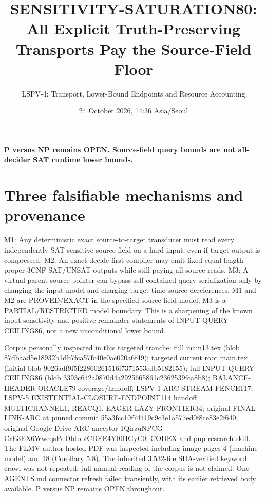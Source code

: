 \documentclass[11pt]{article}
\title{SENSITIVITY-SATURATION80: All Explicit Truth-Preserving Transports Pay the Source-Field Floor}
\author{LSPV-4: Transport, Lower-Bound Endpoints and Resource Accounting}
\date{24 October 2026, 14:36 Asia/Seoul}
\begin{document}
\maketitle
\begin{center}\textbf{P versus NP remains OPEN. Source-field query bounds are not all-decider SAT runtime lower bounds.}\end{center}

\section{Three falsifiable mechanisms and provenance}
M1: Any deterministic exact source-to-target transducer must read every independently SAT-sensitive source field on a hard input, even if target output is compressed. M2: An exact decide-first compiler may emit fixed equal-length proper-3CNF SAT/UNSAT outputs while still paying all source reads. M3: A virtual parent-source pointer can bypass self-contained-query serialization only by changing the input model and charging target-time source dereferences. M1 and M2 are PROVED/EXACT in the specified source-field model; M3 is a PARTIAL/RESTRICTED model boundary. This is a sharpening of the known input sensitivity and positive-remainder statements of INPUT-QUERY-CEILING86, not a new unconditional lower bound.

Corpus personally inspected in this targeted tranche: full main13.tex (blob 87dbaad5e18932b1db7fca57fc40e0ac020a6f49); targeted current root main.tex (initial blob 9026adf9f5f22860261516f7371553edb5182155); full INPUT-QUERY-CEILING86 (blob 3393c642a0870d4a2925665861c2362539fca8b8); BALANCE-HEADER-ORACLE79 coverage/handoff; LSPV-1 ARC-STREAM-FENCE117; LSPV-5 EXISTENTIAL-CLOSURE-ENDPOINT114 handoff; MULTICHANNEL1, REACQ1, EAGER-LAZY-FRONTIER34; original FINAL-LINK-ARC at pinned commit 55a3fcc10f74419c9c3e1a577ed0f8ce83e2f640; original Google Drive ARC ancestor 1QirzuNPCG-CrE3EX6WweqsPdDbtoblCDEE4YI0HGyC0; CODEX and pnp-research skill. The FLMV author-hosted PDF was inspected including image pages 4 (machine model) and 18 (Corollary 5.8). The inherited 3,532-file SHA-verified keyword crawl was not repeated; full manual reading of the corpus is not claimed. One AGENTS.md connector refresh failed transiently, with its earlier retrieved body available. P versus NP remains OPEN throughout.
\end{document}
